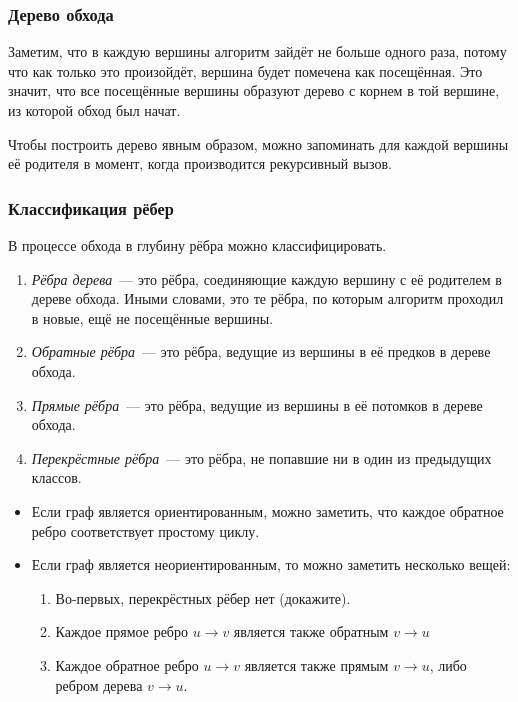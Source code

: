 \documentclass[a4paper,12pt]{article}
\begin{document}
      \subsubsection{Дерево обхода}

      Заметим, что в каждую вершины алгоритм зайдёт не больше одного
      раза, потому что как только это произойдёт, вершина будет помечена
      как посещённая. Это значит, что все посещённые вершины образуют
      дерево с корнем в той вершине, из которой обход был начат.

      Чтобы построить дерево явным образом, можно запоминать для
      каждой вершины её родителя в момент, когда производится рекурсивный
      вызов.

      \subsubsection{Классификация рёбер}

      В процессе обхода в глубину рёбра можно классифицировать.

      \begin{enumerate}
        \item \emph{Рёбра дерева}~--- это рёбра, соединяющие каждую вершину
          с её родителем в дереве обхода. Иными словами, это те рёбра,
          по которым алгоритм проходил в новые, ещё не посещённые вершины.
        \item \emph{Обратные рёбра}~--- это рёбра, ведущие из вершины в её
          предков в дереве обхода.
        \item \emph{Прямые рёбра}~--- это рёбра, ведущие из вершины в
          её потомков в дереве обхода.
        \item \emph{Перекрёстные рёбра}~--- это рёбра, не попавшие
          ни в один из предыдущих классов.
      \end{enumerate}

      \begin{itemize}
        \item Если граф является ориентированным, можно заметить,
          что каждое обратное ребро соответствует простому циклу.

        \item Если граф является неориентированным, то можно заметить
          несколько вещей:
          \begin{enumerate}
            \item Во-первых, перекрёстных рёбер нет (докажите).
            \item Каждое прямое ребро $u \to v$ является также обратным
              $v \to u$
            \item Каждое обратное ребро $u \to v$ является также
              прямым $v \to u$, либо ребром дерева $v \to u$.
          \end{enumerate}
      \end{itemize}
\end{document}
